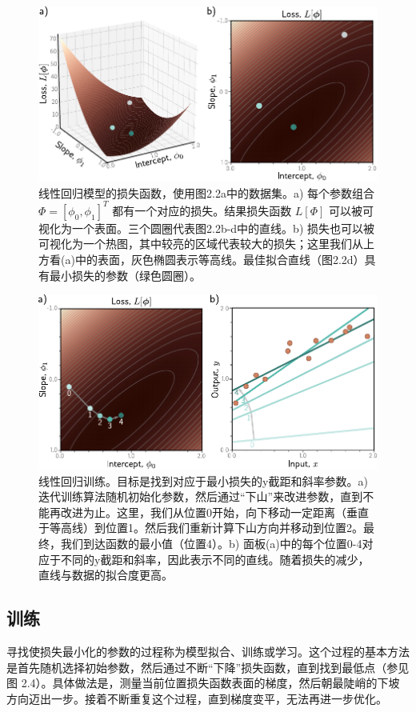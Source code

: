 \documentclass[lang=cn,newtx,10pt,scheme=chinese]{elegantbook}
\begin{document}
\begin{figure}
	\centering
	\includegraphics[width=0.7\linewidth]{PDFFigures/UDLChap2PDF/SupervisedSurface.pdf}
	\caption{线性回归模型的损失函数，使用图2.2a中的数据集。a) 每个参数组合 $\Phi = [\phi_0, \phi_1]^T$ 都有一个对应的损失。结果损失函数 $L[\Phi]$ 可以被可视化为一个表面。三个圆圈代表图2.2b-d中的直线。b) 损失也可以被可视化为一个热图，其中较亮的区域代表较大的损失；这里我们从上方看(a)中的表面，灰色椭圆表示等高线。最佳拟合直线（图2.2d）具有最小损失的参数（绿色圆圈）。}
\end{figure}

\begin{figure}
	\centering
	\includegraphics[width=0.7\linewidth]{PDFFigures/UDLChap2PDF/SupervisedOpt.pdf}
	\caption{线性回归训练。目标是找到对应于最小损失的y截距和斜率参数。a) 迭代训练算法随机初始化参数，然后通过“下山”来改进参数，直到不能再改进为止。这里，我们从位置0开始，向下移动一定距离（垂直于等高线）到位置1。然后我们重新计算下山方向并移动到位置2。最终，我们到达函数的最小值（位置4）。b) 面板(a)中的每个位置0-4对应于不同的y截距和斜率，因此表示不同的直线。随着损失的减少，直线与数据的拟合度更高。}
\end{figure}

\subsection{训练}

寻找使损失最小化的参数的过程称为模型拟合、训练或学习。这个过程的基本方法是首先随机选择初始参数，然后通过不断“下降”损失函数，直到找到最低点（参见图 2.4）。具体做法是，测量当前位置损失函数表面的梯度，然后朝最陡峭的下坡方向迈出一步。接着不断重复这个过程，直到梯度变平，无法再进一步优化。
\end{document}
